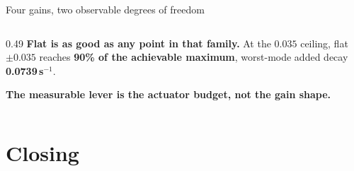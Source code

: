 \documentclass[aspectratio=169]{beamer}
\begin{document}
\begin{frame}{Four gains, two observable degrees of freedom}
\begin{columns}[T]
\begin{column}{0.49\textwidth}
      \vspace{2mm}
      \textbf{Flat is as good as any point in that family.} At the $0.035$
      ceiling, flat $\pm 0.035$ reaches \textbf{90\% of the achievable maximum},
      worst-mode added decay \textbf{0.0739\,s$^{-1}$}.

      \vspace{2mm}
      \textbf{The measurable lever is the actuator budget, not the gain
      shape.}
    \end{column}
  \end{columns}
\end{frame}

\section{Closing}
\end{document}

